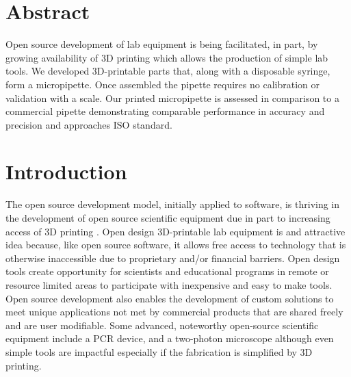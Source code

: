 \documentclass[10pt,letterpaper]{article}
\begin{document}
\section*{Abstract}
Open source development of lab equipment is being facilitated, in part, by growing availability of 3D printing which allows the production of simple lab tools.
We developed 3D-printable parts that, along with a disposable syringe, form a micropipette.
Once assembled the pipette requires no calibration or validation with a scale.
Our printed micropipette is assessed in comparison to a commercial pipette demonstrating comparable performance in accuracy and precision and approaches ISO standard.

\linenumbers

\section*{Introduction}
The open source development model, initially applied to software, is thriving in the development of open source scientific equipment due in part to increasing access of 3D printing \cite{Baden2015,Pearce2014}.
Open design 3D-printable lab equipment is and attractive idea because, like open source software, it allows free access to technology that is otherwise inaccessible due to proprietary and/or financial barriers. 
Open design tools create opportunity for scientists and educational programs in remote or resource limited areas to participate with inexpensive and easy to make tools\cite{Baden2015}. 
Open source development also enables the development of custom solutions to meet unique applications not met by commercial products that are shared freely and are user modifiable\cite{Fullerton2014,Pearce2012}.
Some advanced, noteworthy open-source scientific equipment include a PCR device\cite{ChaiBiotechnologiesInc2015}, and a two-photon microscope\cite{Rosenegger2014} although even simple tools are impactful especially if the fabrication is simplified by 3D printing.
\end{document}
